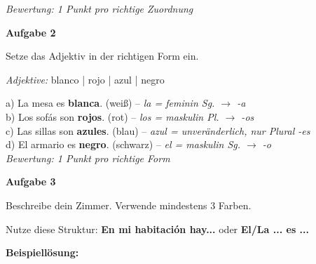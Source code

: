 \documentclass[11pt, a4paper]{article}
\newcommand{\fachfarbe}{spanisch}
\newcommand{\punktebox}[1]{\hfill\fbox{\small \_/#1}}
\newcommand{\loesung}[1]{\textcolor{loesung}{\textbf{#1}}}
\newenvironment{aufgabe}[1]{%
    \needspace{5\baselineskip}%
    \nopagebreak[4]%
    \vspace{10pt}
    \noindent\textbf{\textcolor{\fachfarbe}{Aufgabe #1}}
    \nopagebreak[4]%
    \vspace{5pt}
    \nopagebreak[4]%
    \begin{list}{}{\leftmargin=0pt}
    \item[]
}{%
    \end{list}
}
\newcommand{\es}[1]{\textcolor{\fachfarbe}{\textbf{#1}}}
\begin{document}
\textit{\textcolor{grau}{Bewertung: 1 Punkt pro richtige Zuordnung}}

\vspace{15pt}


\begin{aufgabe}{2}
Setze das Adjektiv in der richtigen Form ein. \punktebox{4}
\end{aufgabe}

\begin{vokabelkasten}
\textit{Adjektive:} blanco | rojo | azul | negro
\end{vokabelkasten}

\vspace{0.5em}

\noindent
a) La mesa es \loesung{blanca}. (weiß) -- \textit{la = feminin Sg. $\rightarrow$ -a} \\[0.8em]
b) Los sofás son \loesung{rojos}. (rot) -- \textit{los = maskulin Pl. $\rightarrow$ -os} \\[0.8em]
c) Las sillas son \loesung{azules}. (blau) -- \textit{azul = unveränderlich, nur Plural -es} \\[0.8em]
d) El armario es \loesung{negro}. (schwarz) -- \textit{el = maskulin Sg. $\rightarrow$ -o} \\

\textit{\textcolor{grau}{Bewertung: 1 Punkt pro richtige Form}}

\vspace{15pt}


\begin{aufgabe}{3}
Beschreibe dein Zimmer. Verwende mindestens 3 Farben. \punktebox{6}
\end{aufgabe}

\begin{hinweis}
Nutze diese Struktur: \es{En mi habitación hay...} oder \es{El/La ... es ...}
\end{hinweis}

\vspace{0.5em}

\noindent
\textbf{Beispiellösung:}
\end{document}
